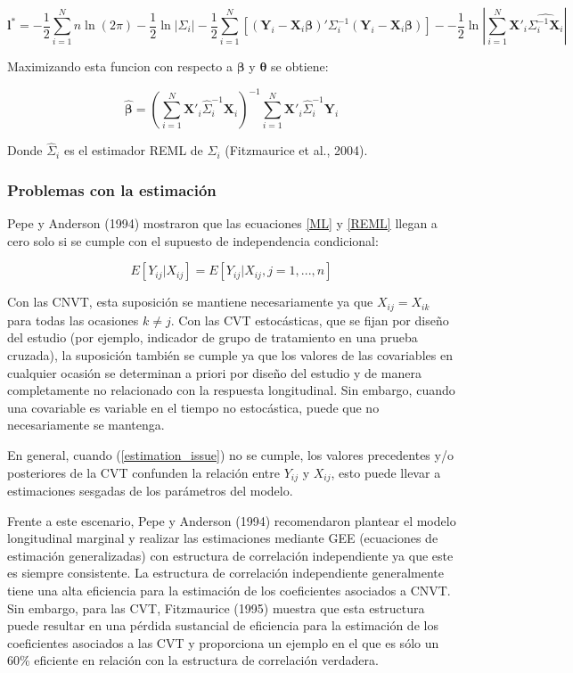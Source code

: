 \documentclass[spanish]{article}
\numberwithin{figure}{subsection}
\numberwithin{equation}{subsection}
\numberwithin{table}{subsection}
\begin{document}
\begin{equation}
\label{REML}
	\bm{l}^* = -\frac{1}{2} \sum_{i=1}^{N}n \ln(2\pi) - \frac{1}{2}\ln|\bm{\varSigma}_i| -
	\frac{1}{2} \sum_{i=1}^{N} [(\bm{Y}_i - \bm{X}_i\bm{\beta})'
	\bm{\varSigma}_i^{-1} (\bm{Y}_i - \bm{X}_i\bm{\beta})] -
	- \frac{1}{2} \ln |\sum_{i=1}^{N} \bm{X}'_i \hat{\bm{\varSigma}_i^{-1} \bm{X}_i}|
\end{equation}

Maximizando esta funcion con respecto a $\bm{\beta}$ y $\bm{\theta}$ se obtiene:

\[ \hat{\bm{\beta}} = (\sum_{i=1}^{N} \bm{X}'_i \hat{\bm{\varSigma}}_i^{-1} \bm{X}_i)^{-1}
\sum_{i=1}^{N} \bm{X}'_i \hat{\bm{\varSigma}}_i^{-1} \bm{Y}_i\]

Donde $\hat{\bm{\varSigma}}_i$ es el estimador REML de ${\bm{\varSigma}_i}$ (Fitzmaurice et al., 2004).

\subsubsection{Problemas con la estimación}

Pepe y Anderson (1994) mostraron que las ecuaciones \ref{ML} y \ref{REML} llegan
a cero solo si se cumple con el supuesto de independencia condicional:

\begin{equation}
\label{estimation_issue}
	E[Y_{ij} | X_{ij}] = E[Y_{ij} | X_{ij}, j = 1, ..., n]
\end{equation}

Con las CNVT, esta suposición se mantiene necesariamente ya que $X_{ij} =
X_{ik}$ para todas las ocasiones $k \neq j$. Con las CVT estocásticas, que se
fijan por diseño del estudio (por ejemplo, indicador de grupo de tratamiento en
una prueba cruzada), la suposición también se cumple ya que los valores de las
covariables en cualquier ocasión se determinan a priori por diseño del estudio y
de manera completamente no relacionado con la respuesta longitudinal. Sin
embargo, cuando una covariable es variable en el tiempo no estocástica, puede
que no necesariamente se mantenga.

En general, cuando (\ref{estimation_issue}) no se cumple, los valores
precedentes y/o posteriores de la CVT confunden la relación entre $Y_{ij}$ y
$X_{ij}$, esto puede llevar a estimaciones sesgadas de los parámetros del
modelo.

Frente a este escenario, Pepe y Anderson (1994) recomendaron plantear el modelo
longitudinal marginal y realizar las estimaciones mediante GEE (ecuaciones de
estimación generalizadas) con estructura de correlación independiente ya que
este es siempre consistente. La estructura de correlación independiente
generalmente tiene una alta eficiencia para la estimación de los coeficientes
asociados a CNVT. Sin embargo, para las CVT, Fitzmaurice (1995) muestra que esta
estructura puede resultar en una pérdida sustancial de eficiencia para la
estimación de los coeficientes asociados a las CVT y proporciona un ejemplo en
el que es sólo un 60\% eficiente en relación con la estructura de correlación
verdadera.
\end{document}
